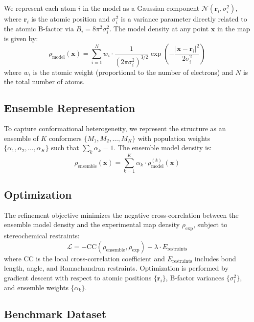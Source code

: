 \documentclass[11pt]{article}
\begin{document}
We represent each atom $i$ in the model as a Gaussian component $\mathcal{N}(\mathbf{r}_i, \sigma_i^2)$, where $\mathbf{r}_i$ is the atomic position and $\sigma_i^2$ is a variance parameter directly related to the atomic B-factor via $B_i = 8\pi^2 \sigma_i^2$. The model density at any point $\mathbf{x}$ in the map is given by:
\begin{equation}
\rho_{\text{model}}(\mathbf{x}) = \sum_{i=1}^{N} w_i \cdot \frac{1}{(2\pi\sigma_i^2)^{3/2}} \exp\left(-\frac{|\mathbf{x} - \mathbf{r}_i|^2}{2\sigma_i^2}\right)
\end{equation}
where $w_i$ is the atomic weight (proportional to the number of electrons) and $N$ is the total number of atoms.

\subsection{Ensemble Representation}

To capture conformational heterogeneity, we represent the structure as an ensemble of $K$ conformers $\{M_1, M_2, \ldots, M_K\}$ with population weights $\{\alpha_1, \alpha_2, \ldots, \alpha_K\}$ such that $\sum_k \alpha_k = 1$. The ensemble model density is:
\begin{equation}
\rho_{\text{ensemble}}(\mathbf{x}) = \sum_{k=1}^{K} \alpha_k \cdot \rho_{\text{model}}^{(k)}(\mathbf{x})
\end{equation}

\subsection{Optimization}

The refinement objective minimizes the negative cross-correlation between the ensemble model density and the experimental map density $\rho_{\text{exp}}$, subject to stereochemical restraints:
\begin{equation}
\mathcal{L} = -\text{CC}(\rho_{\text{ensemble}}, \rho_{\text{exp}}) + \lambda \cdot E_{\text{restraints}}
\end{equation}
where $\text{CC}$ is the local cross-correlation coefficient and $E_{\text{restraints}}$ includes bond length, angle, and Ramachandran restraints. Optimization is performed by gradient descent with respect to atomic positions $\{\mathbf{r}_i\}$, B-factor variances $\{\sigma_i^2\}$, and ensemble weights $\{\alpha_k\}$.

\subsection{Benchmark Dataset}
\end{document}
